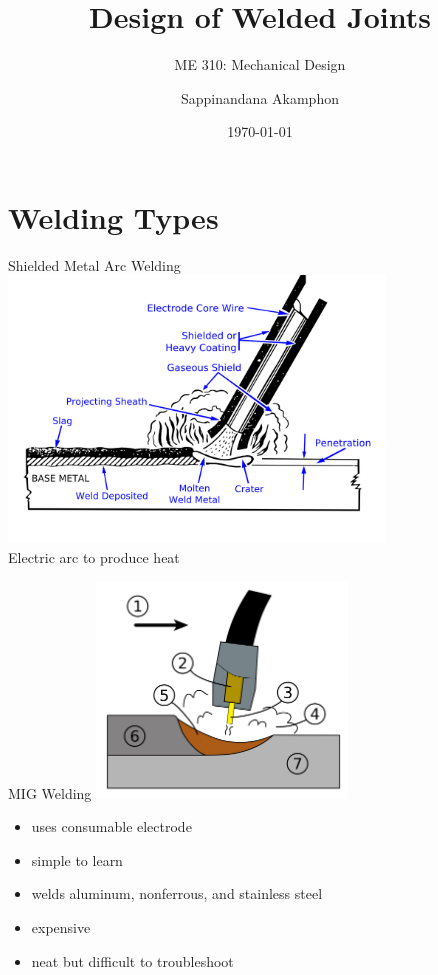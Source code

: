 \documentclass[10pt, svgnames]{beamer}
\author{Sappinandana Akamphon}
\date{\today}
\title{Design of Welded Joints}
\subtitle{ME 310: Mechanical Design}
\institute{Department of Mechanical Engineering, TSE}
\date{}
\begin{document}
\maketitle

\section{Welding Types}
\label{sec:org57f72a8}
\begin{frame}[label={sec:org0789133}]{Shielded Metal Arc Welding}
\centering
\includegraphics[width=0.75\textwidth]{pictures/shield-metal-arc-welding} \\\empty
Electric arc to produce heat
\end{frame}

\begin{frame}[label={sec:orgca5166a}]{MIG Welding}
\centering
\includegraphics[width=0.5\textwidth]{pictures/gas-metal-arc-welding}
\begin{itemize}
\item uses consumable electrode
\item simple to learn
\item welds aluminum, nonferrous, and stainless steel
\item expensive
\item neat but difficult to troubleshoot
\end{itemize}
\end{frame}
\end{document}
